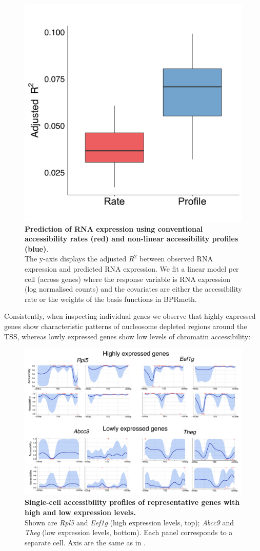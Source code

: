 \begin{figure}[H]
	\centering
	\includegraphics[width=0.55\linewidth]{scNMT_profiles_prediction}
	\caption[]{\textbf{Prediction of RNA expression using conventional accessibility rates (red) and non-linear accessibility profiles (blue)}.\\
	The y-axis displays the adjusted $R^2$ between observed RNA expression and predicted RNA expression. We fit a linear model per cell (across genes) where the response variable is RNA expression (log normalised counts) and the covariates are either the accessibility rate or the weights of the basis functions in BPRmeth.}
	\label{fig:scnmt_profiles_prediction}
\end{figure}

Consistently, when inspecting individual genes we observe that highly expressed genes show characteristic patterns of nucleosome depleted regions around the TSS, whereas lowly expressed genes show low levels of chromatin accessibility:

\begin{figure}[H]
	\centering
	\includegraphics[width=0.9\linewidth]{scNMT_profiles_expr}
	\caption[]{\textbf{Single-cell accessibility profiles of representative genes with high and low expression levels.}\\
	Shown are \textit{Rpl5} and \textit{Eef1g} (high expression levels, top); \textit{Abcc9} and \textit{Theg} (low expression levels, bottom). Each panel corresponds to a separate cell. Axis are the same as in . }
	\label{fig:scnmt_profiles_highexpr}
\end{figure}

